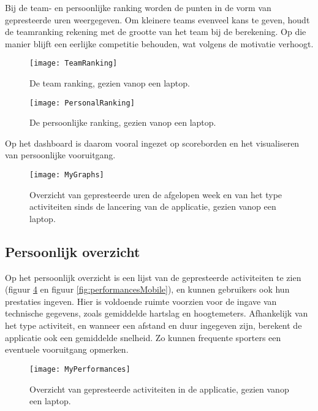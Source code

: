 Bij de team- en persoonlijke ranking worden de punten in de vorm van gepresteerde uren weergegeven. Om kleinere teams evenveel kans te geven, houdt de teamranking rekening met de grootte van het team bij de berekening. Op die manier blijft een eerlijke competitie behouden, wat volgens \textcite{Ivanova2019} de motivatie verhoogt.

\begin{figure}[h]
    \caption[Team ranking]{De team ranking, gezien vanop een laptop.}
    \texttt{[image: TeamRanking]}
    \label{fig:teamRanking}
\end{figure}

\begin{figure}[h]
    \caption[Persoonlijke ranking]{De persoonlijke ranking, gezien vanop een laptop.}
    \texttt{[image: PersonalRanking]}
    \label{fig:personalRanking}
\end{figure}

Op het dashboard is daarom vooral ingezet op scoreborden en het visualiseren van persoonlijke vooruitgang.

\begin{figure}[h]
    \caption[Overzicht prestaties dashboard website]{Overzicht van gepresteerde uren de afgelopen week en van het type activiteiten sinds de lancering van de applicatie, gezien vanop een laptop.}
    \texttt{[image: MyGraphs]}
    \label{fig:graphs}
\end{figure}

\subsection{Persoonlijk overzicht}
Op het persoonlijk overzicht is een lijst van de gepresteerde activiteiten te zien (figuur \ref{fig:performances} en figuur \ref{fig:performancesMobile}), en kunnen gebruikers ook hun prestaties ingeven. Hier is voldoende ruimte voorzien voor de ingave van technische gegevens, zoals gemiddelde hartslag en hoogtemeters. Afhankelijk van het type activiteit, en wanneer een afstand en duur ingegeven zijn, berekent de applicatie ook een gemiddelde snelheid. Zo kunnen frequente sporters een eventuele vooruitgang opmerken.

\begin{figure}[h]
    \caption[Overzicht activiteiten website]{Overzicht van gepresteerde activiteiten in de applicatie, gezien vanop een laptop.}
    \texttt{[image: MyPerformances]}
    \label{fig:performances}
\end{figure}

